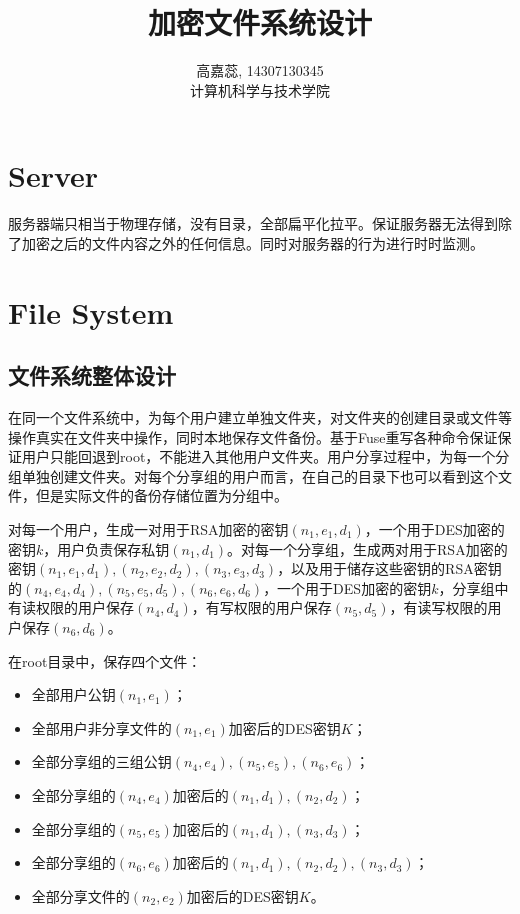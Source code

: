 \documentclass[11pt, oneside]{ctexart}
\begin{document}
\title{加密文件系统设计}
\author{高嘉蕊, 14307130345 \\ 计算机科学与技术学院}
\maketitle

\section{Server}
服务器端只相当于物理存储，没有目录，全部扁平化拉平。保证服务器无法得到除了加密之后的文件内容之外的任何信息。同时对服务器的行为进行时时监测。


\section{File System}
\subsection{文件系统整体设计}
在同一个文件系统中，为每个用户建立单独文件夹，对文件夹的创建目录或文件等操作真实在文件夹中操作，同时本地保存文件备份。基于Fuse重写各种命令保证保证用户只能回退到root，不能进入其他用户文件夹。用户分享过程中，为每一个分组单独创建文件夹。对每个分享组的用户而言，在自己的目录下也可以看到这个文件，但是实际文件的备份存储位置为分组中。

对每一个用户，生成一对用于RSA加密的密钥$(n_1, e_1, d_1)$，一个用于DES加密的密钥$k$，用户负责保存私钥$(n_1, d_1)$。对每一个分享组，生成两对用于RSA加密的密钥$(n_1, e_1, d_1), (n_2, e_2, d_2), (n_3, e_3, d_3)$，以及用于储存这些密钥的RSA密钥的$(n_4, e_4, d_4), (n_5, e_5, d_5), (n_6, e_6, d_6)$，一个用于DES加密的密钥$k$，分享组中有读权限的用户保存$(n_4, d_4)$，有写权限的用户保存$(n_5, d_5)$，有读写权限的用户保存$(n_6, d_6)$。

在root目录中，保存四个文件：
\begin{itemize}
\item 全部用户公钥$(n_1, e_1)$；
\item 全部用户非分享文件的$(n_1, e_1)$加密后的DES密钥$K$；
\item 全部分享组的三组公钥$(n_4, e_4), (n_5, e_5), (n_6, e_6)$；
\item 全部分享组的$(n_4, e_4)$加密后的$(n_1, d_1), (n_2, d_2)$；
\item 全部分享组的$(n_5, e_5)$加密后的$(n_1, d_1), (n_3, d_3)$；
\item 全部分享组的$(n_6, e_6)$加密后的$(n_1, d_1), (n_2, d_2), (n_3, d_3)$；
\item 全部分享文件的$(n_2, e_2)$加密后的DES密钥$K$。
\end{itemize}
\end{document}
